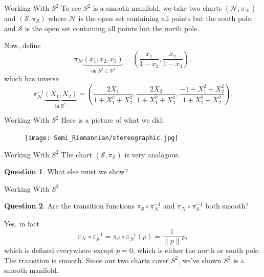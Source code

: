 \documentclass[usenames,dvipsnames]{beamer}
\theoremstyle{definition}
\newtheorem*{question}{Question}
\theoremstyle{theorem}
\newcommand{\R}{\mathbb{R}}
\begin{document}
        \begin{frame}{Working With $S^2$}
                To see $S^2$ is a smooth manifold, we take two charts $(\mathcal{N},\pi_\mathcal{N})$ and $(\mathcal{S},\pi_\mathcal{S})$ where $\mathcal{N}$ is the open set containing all points but the south pole, and $\mathcal{S}$ is the open set containing all points but the north pole.
                
                Now, define 
                \[
                \pi_{\mathcal{N}}\underbrace{(x_1,x_2,x_3)}_{\textrm{on $S^2 \subset \R^3$}}=\left(\frac{x_1}{1-x_3},\frac{x_2}{1-x_3}\right),
                \]
                which has inverse
                \[
                \pi_{\mathcal{N}}^{-1}\underbrace{(X_1,X_2)}_{\textrm{in $\R^2$}}=\left(\frac{2X_1}{1+X_1^2+X_2^2},\frac{2X_2}{1+X_1^2+X_2^2},\frac{-1+X_1^2+X_2^2}{1+X_1^2+X_2^2}\right).
                \]
        \end{frame}
        
        \begin{frame}{Working With $S^2$}
                Here is a picture of what we did:
                \begin{figure}
                    \centering
                    \texttt{[image: Semi\_Riemannian/stereographic.jpg]}
                \end{figure}
        \end{frame}
        
        \begin{frame}{Working With $S^2$}
            The chart $(\mathcal{S},\pi_\mathcal{S})$ is very analogous.
            \vspace*{0.5cm}
            \begin{question}
                What else must we show?
            \end{question}
        \end{frame}
        
        \begin{frame}{Working With $S^2$}
            \begin{question}
                Are the transition functions $\pi_{\mathcal{S}}\circ \pi_{\mathcal{N}}^{-1}$ and $\pi_{\mathcal{N}}\circ \pi_{\mathcal{S}}^{-1}$ both smooth?
            \end{question}
            \vspace*{0.5cm}
            Yes, in fact
            \[
            \pi_\mathcal{N}\circ \pi_\mathcal{S}^{-1} = \pi_\mathcal{S} \circ \pi_\mathcal{N}^{-1}(p)=\frac{1}{\|p\|}p,
            \]
            which is defined everywhere except $p=0$, which is either the north or south pole.  The transition is smooth. Since our two charts cover $S^2$, we've shown $S^2$ is a smooth manifold.
        \end{frame}
        
\end{document}
